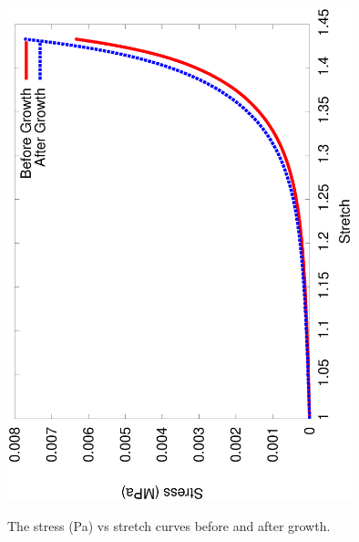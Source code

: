 \begin{figure}[ht]
  \centering
     {\includegraphics[angle=270,width=10.00cm]{images/stress-stretch.eps}}
     \caption{The stress (Pa) vs stretch curves before and after
       growth.}
     \label{stress_strain}
\end{figure}

